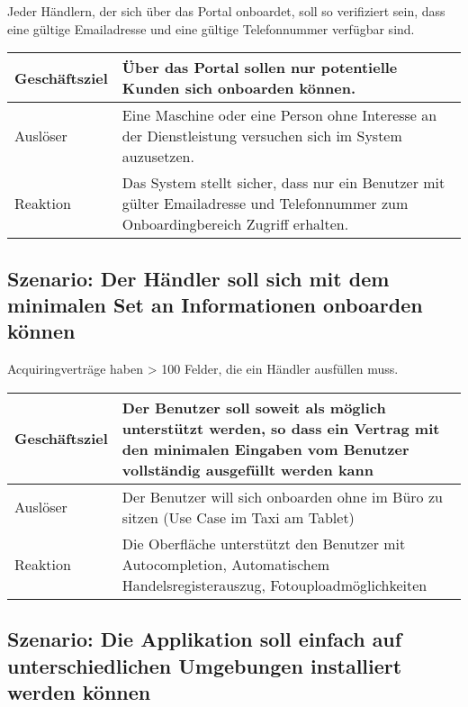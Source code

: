 Jeder Händlern, der sich über das Portal onboardet, soll so verifiziert sein, dass eine gültige Emailadresse und eine gültige Telefonnummer verfügbar sind.

\begin{table}[H]
	\centering
	\begin{tabular}{ | p{3cm} | p{11cm} | }
		\toprule
		Geschäftsziel & Über das Portal sollen nur potentielle Kunden sich onboarden können. \\ \hline
		Auslöser & Eine Maschine oder eine Person ohne Interesse an der Dienstleistung versuchen sich im System auzusetzen. \\ \hline
		Reaktion & Das System stellt sicher, dass nur ein Benutzer mit gülter Emailadresse und Telefonnummer zum Onboardingbereich Zugriff erhalten. \\
		\bottomrule
	\end{tabular}
\end{table}

\subsection{Szenario: Der Händler soll sich mit dem minimalen Set an Informationen onboarden können}

Acquiringverträge haben > 100 Felder, die ein Händler ausfüllen muss.

\begin{table}[H]
	\centering
	\begin{tabular}{ | p{3cm} | p{11cm} | }
		\toprule
		Geschäftsziel & Der Benutzer soll soweit als möglich unterstützt werden, so dass ein Vertrag mit den minimalen Eingaben vom Benutzer vollständig ausgefüllt werden kann \\ \hline
		Auslöser & Der Benutzer will sich onboarden ohne im Büro zu sitzen (Use Case im Taxi am Tablet) \\ 	\hline
		Reaktion & Die Oberfläche unterstützt den Benutzer mit Autocompletion, Automatischem Handelsregisterauszug, Fotouploadmöglichkeiten \\
		\bottomrule
	\end{tabular}
\end{table}

\subsection{Szenario: Die Applikation soll einfach auf unterschiedlichen Umgebungen installiert werden können}

